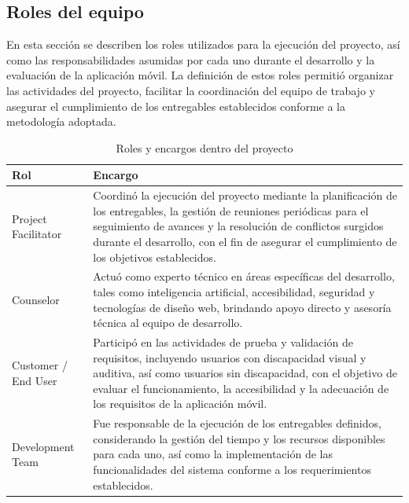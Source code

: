 \documentclass[lettersize,journal]{IEEEtran}
\begin{document}
        \subsection{Roles del equipo}
        
        En esta sección se describen los roles utilizados para la ejecución del proyecto, así como las responsabilidades asumidas por cada uno durante el desarrollo y la evaluación de la aplicación móvil. La definición de estos roles permitió organizar las actividades del proyecto, facilitar la coordinación del equipo de trabajo y asegurar el cumplimiento de los entregables establecidos conforme a la metodología adoptada.

        \begin{table}[H]
        	\centering
        	\caption{Roles y encargos dentro del proyecto}
        	\begin{tabular}{|p{1cm}|p{\dimexpr\linewidth-2\tabcolsep-4cm}|}
        		\hline
        		\textbf{Rol} & \textbf{Encargo} \\ \hline
        		Project Facilitator &
        		Coordinó la ejecución del proyecto mediante la planificación de los entregables, la gestión de reuniones periódicas para el seguimiento de avances y la resolución de conflictos surgidos durante el desarrollo, con el fin de asegurar el cumplimiento de los objetivos establecidos. \\ \hline
        		
        		Counselor &
        		Actuó como experto técnico en áreas específicas del desarrollo, tales como inteligencia artificial, accesibilidad, seguridad y tecnologías de diseño web, brindando apoyo directo y asesoría técnica al equipo de desarrollo. \\ \hline
        		
        		Customer / End User &
        		Participó en las actividades de prueba y validación de requisitos, incluyendo usuarios con discapacidad visual y auditiva, así como usuarios sin discapacidad, con el objetivo de evaluar el funcionamiento, la accesibilidad y la adecuación de los requisitos de la aplicación móvil. \\ \hline
        		
        		Development Team &
        		Fue responsable de la ejecución de los entregables definidos, considerando la gestión del tiempo y los recursos disponibles para cada uno, así como la implementación de las funcionalidades del sistema conforme a los requerimientos establecidos. \\ \hline
        		
        	\end{tabular}
        \end{table}
        
\end{document}

